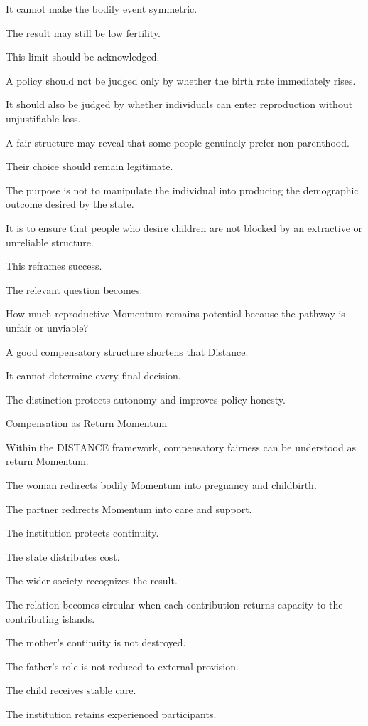 It cannot make the bodily event symmetric.

The result may still be low fertility.

This limit should be acknowledged.

A policy should not be judged only by whether the birth rate immediately rises.

It should also be judged by whether individuals can enter reproduction without unjustifiable loss.

A fair structure may reveal that some people genuinely prefer non-parenthood.

Their choice should remain legitimate.

The purpose is not to manipulate the individual into producing the demographic outcome desired by the state.

It is to ensure that people who desire children are not blocked by an extractive or unreliable structure.

This reframes success.

The relevant question becomes:

How much reproductive Momentum remains potential because the pathway is unfair or unviable?

A good compensatory structure shortens that Distance.

It cannot determine every final decision.

The distinction protects autonomy and improves policy honesty.

Compensation as Return Momentum

Within the DISTANCE framework, compensatory fairness can be understood as return Momentum.

The woman redirects bodily Momentum into pregnancy and childbirth.

The partner redirects Momentum into care and support.

The institution protects continuity.

The state distributes cost.

The wider society recognizes the result.

The relation becomes circular when each contribution returns capacity to the contributing islands.

The mother’s continuity is not destroyed.

The father’s role is not reduced to external provision.

The child receives stable care.

The institution retains experienced participants.


